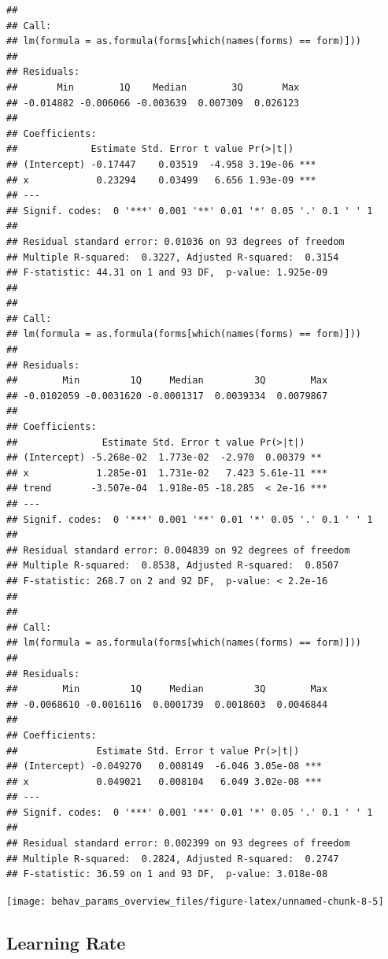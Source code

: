 \documentclass[
]{article}
\begin{document}
\begin{verbatim}
## 
## Call:
## lm(formula = as.formula(forms[which(names(forms) == form)]))
## 
## Residuals:
##       Min        1Q    Median        3Q       Max 
## -0.014882 -0.006066 -0.003639  0.007309  0.026123 
## 
## Coefficients:
##             Estimate Std. Error t value Pr(>|t|)    
## (Intercept) -0.17447    0.03519  -4.958 3.19e-06 ***
## x            0.23294    0.03499   6.656 1.93e-09 ***
## ---
## Signif. codes:  0 '***' 0.001 '**' 0.01 '*' 0.05 '.' 0.1 ' ' 1
## 
## Residual standard error: 0.01036 on 93 degrees of freedom
## Multiple R-squared:  0.3227, Adjusted R-squared:  0.3154 
## F-statistic: 44.31 on 1 and 93 DF,  p-value: 1.925e-09
## 
## 
## Call:
## lm(formula = as.formula(forms[which(names(forms) == form)]))
## 
## Residuals:
##        Min         1Q     Median         3Q        Max 
## -0.0102059 -0.0031620 -0.0001317  0.0039334  0.0079867 
## 
## Coefficients:
##               Estimate Std. Error t value Pr(>|t|)    
## (Intercept) -5.268e-02  1.773e-02  -2.970  0.00379 ** 
## x            1.285e-01  1.731e-02   7.423 5.61e-11 ***
## trend       -3.507e-04  1.918e-05 -18.285  < 2e-16 ***
## ---
## Signif. codes:  0 '***' 0.001 '**' 0.01 '*' 0.05 '.' 0.1 ' ' 1
## 
## Residual standard error: 0.004839 on 92 degrees of freedom
## Multiple R-squared:  0.8538, Adjusted R-squared:  0.8507 
## F-statistic: 268.7 on 2 and 92 DF,  p-value: < 2.2e-16
## 
## 
## Call:
## lm(formula = as.formula(forms[which(names(forms) == form)]))
## 
## Residuals:
##        Min         1Q     Median         3Q        Max 
## -0.0068610 -0.0016116  0.0001739  0.0018603  0.0046844 
## 
## Coefficients:
##              Estimate Std. Error t value Pr(>|t|)    
## (Intercept) -0.049270   0.008149  -6.046 3.05e-08 ***
## x            0.049021   0.008104   6.049 3.02e-08 ***
## ---
## Signif. codes:  0 '***' 0.001 '**' 0.01 '*' 0.05 '.' 0.1 ' ' 1
## 
## Residual standard error: 0.002399 on 93 degrees of freedom
## Multiple R-squared:  0.2824, Adjusted R-squared:  0.2747 
## F-statistic: 36.59 on 1 and 93 DF,  p-value: 3.018e-08
\end{verbatim}

\begin{center}\texttt{[image: behav\_params\_overview\_files/figure-latex/unnamed-chunk-8-5]} \end{center}

\subsection{Learning Rate}\label{learning-rate}
\end{document}
